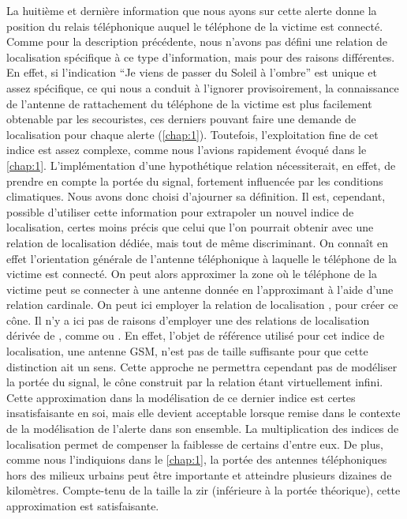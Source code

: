 La huitième et dernière information que nous ayons sur cette alerte
donne la position du relais téléphonique auquel le téléphone de la
victime est connecté. Comme pour la description précédente, nous
n'avons pas défini une relation de localisation spécifique à ce type
d'information, mais pour des raisons différentes. En effet, si
l’indication \enquote{Je viens de passer du Soleil à l'ombre} est
unique et assez spécifique, ce qui nous a conduit à l'ignorer
provisoirement, la connaissance de l'antenne de rattachement du
téléphone de la victime est plus facilement obtenable par les
secouristes, ces derniers pouvant faire une demande de localisation
pour chaque alerte (\autoref{chap:1}). Toutefois, l'exploitation fine
de cet indice est assez complexe, comme nous l'avions rapidement
évoqué dans le \autoref{chap:1}. L'implémentation d'une hypothétique
relation  nécessiterait, en effet, de
prendre en compte la portée du signal, fortement influencée par les
conditions climatiques. Nous avons donc choisi d'ajourner sa
définition. Il est, cependant, possible d'utiliser cette information
pour extrapoler un nouvel indice de localisation, certes moins précis
que celui que l'on pourrait obtenir avec une relation de localisation
dédiée, mais tout de même discriminant. On connaît en effet
l'orientation générale de l'antenne téléphonique à laquelle le
téléphone de la victime est connecté. On peut alors approximer la zone
où le téléphone de la victime peut se connecter à une antenne donnée
en l'approximant à l'aide d'une relation cardinale. On peut ici
employer la relation de localisation , pour
créer ce cône. Il n'y a ici pas de raisons d'employer une des
relations de localisation dérivée de , comme
 ou
. En effet, l'objet de référence
utilisé pour cet indice de localisation, une antenne GSM, n'est pas de
taille suffisante pour que cette distinction ait un sens. Cette
approche ne permettra cependant pas de modéliser la portée du signal,
le cône construit par la relation  étant
virtuellement infini. Cette approximation dans la modélisation de ce
dernier indice est certes insatisfaisante en soi, mais elle devient
acceptable lorsque remise dans le contexte de la modélisation de
l'alerte dans son ensemble. La multiplication des indices de
localisation permet de compenser la faiblesse de certains d'entre eux.
%
De plus, comme nous l'indiquions dans le \autoref{chap:1}, la portée
des antennes téléphoniques hors des milieux urbains peut être
importante et atteindre plusieurs dizaines de kilomètres. Compte-tenu
de la taille la \ac{zir} (inférieure à la portée théorique), cette
approximation est satisfaisante.

